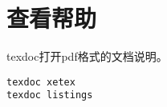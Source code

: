 \section{查看帮助}
texdoc打开pdf格式的文档说明。
\begin{verbatim}
texdoc xetex
texdoc listings
\end{verbatim}




